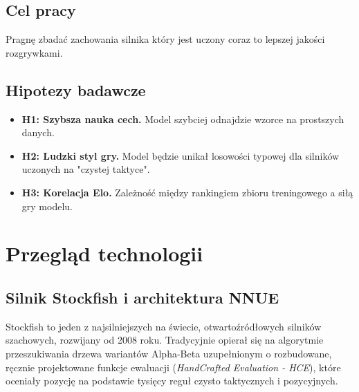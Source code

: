 \documentclass[12pt,a4paper]{report}
\begin{document}
\section{Cel pracy}

Pragnę zbadać zachowania silnika który jest uczony coraz to lepszej jakości rozgrywkami.


\section{Hipotezy badawcze}


\begin{itemize}
    \item \textbf{H1: Szybsza nauka cech.} Model szybciej odnajdzie wzorce na prostszych danych.
    \item \textbf{H2: Ludzki styl gry.} Model będzie unikał losowości typowej dla silników uczonych na "czystej taktyce".
    \item \textbf{H3: Korelacja Elo.} Zależność między rankingiem zbioru treningowego a siłą gry modelu.
\end{itemize}

\chapter{Przegląd technologii}

\section{Silnik Stockfish i architektura NNUE}

Stockfish to jeden z najsilniejszych na świecie, otwartoźródłowych silników szachowych, rozwijany od 2008 roku. Tradycyjnie opierał się na algorytmie przeszukiwania drzewa wariantów Alpha-Beta uzupełnionym o rozbudowane, ręcznie projektowane funkcje ewaluacji (\textit{HandCrafted Evaluation - HCE}), które oceniały pozycję na podstawie tysięcy reguł czysto taktycznych i pozycyjnych.

\end{document}
